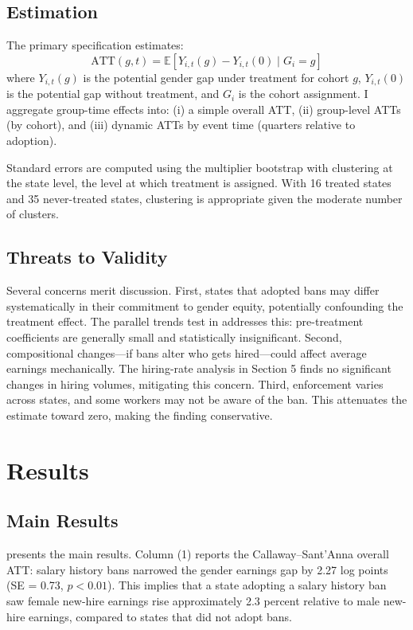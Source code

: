 \documentclass[12pt]{article}
\newcommand{\E}{\mathbb{E}}
\begin{document}
\subsection{Estimation}

The primary specification estimates:
\begin{equation}
\text{ATT}(g,t) = \E[Y_{i,t}(g) - Y_{i,t}(0) \mid G_i = g]
\end{equation}
where $Y_{i,t}(g)$ is the potential gender gap under treatment for cohort $g$, $Y_{i,t}(0)$ is the potential gap without treatment, and $G_i$ is the cohort assignment. I aggregate group-time effects into: (i) a simple overall ATT, (ii) group-level ATTs (by cohort), and (iii) dynamic ATTs by event time (quarters relative to adoption).

Standard errors are computed using the multiplier bootstrap with clustering at the state level, the level at which treatment is assigned. With 16 treated states and 35 never-treated states, clustering is appropriate given the moderate number of clusters.

\subsection{Threats to Validity}

Several concerns merit discussion. First, states that adopted bans may differ systematically in their commitment to gender equity, potentially confounding the treatment effect. The parallel trends test in  addresses this: pre-treatment coefficients are generally small and statistically insignificant. Second, compositional changes---if bans alter who gets hired---could affect average earnings mechanically. The hiring-rate analysis in Section 5 finds no significant changes in hiring volumes, mitigating this concern. Third, enforcement varies across states, and some workers may not be aware of the ban. This attenuates the estimate toward zero, making the finding conservative.


\section{Results}

\subsection{Main Results}



 presents the main results. Column (1) reports the Callaway--Sant'Anna overall ATT: salary history bans narrowed the gender earnings gap by 2.27 log points (SE = 0.73, $p < 0.01$). This implies that a state adopting a salary history ban saw female new-hire earnings rise approximately 2.3 percent relative to male new-hire earnings, compared to states that did not adopt bans.
\end{document}
